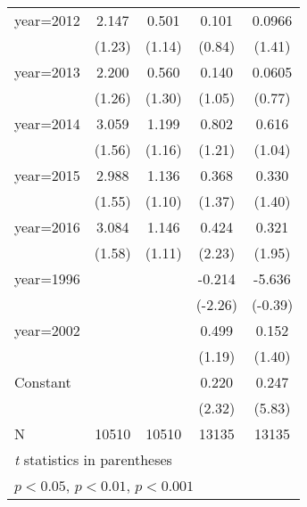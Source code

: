 \begin{table}[htbp]
\begin{tabular}{l*{4}{c}}
\addlinespace
year=2012           &       2.147         &       0.501         &       0.101         &      0.0966         \\
                    &      (1.23)         &      (1.14)         &      (0.84)         &      (1.41)         \\
\addlinespace
year=2013           &       2.200         &       0.560         &       0.140         &      0.0605         \\
                    &      (1.26)         &      (1.30)         &      (1.05)         &      (0.77)         \\
\addlinespace
year=2014           &       3.059         &       1.199         &       0.802         &       0.616         \\
                    &      (1.56)         &      (1.16)         &      (1.21)         &      (1.04)         \\
\addlinespace
year=2015           &       2.988         &       1.136         &       0.368         &       0.330         \\
                    &      (1.55)         &      (1.10)         &      (1.37)         &      (1.40)         \\
\addlinespace
year=2016           &       3.084         &       1.146         &       0.424\sym{*}  &       0.321         \\
                    &      (1.58)         &      (1.11)         &      (2.23)         &      (1.95)         \\
\addlinespace
year=1996           &                     &                     &      -0.214\sym{*}  &      -5.636         \\
                    &                     &                     &     (-2.26)         &     (-0.39)         \\
\addlinespace
year=2002           &                     &                     &       0.499         &       0.152         \\
                    &                     &                     &      (1.19)         &      (1.40)         \\
\addlinespace
Constant            &                     &                     &       0.220\sym{*}  &       0.247\sym{***}\\
                    &                     &                     &      (2.32)         &      (5.83)         \\
\midrule
N                   &       10510         &       10510         &       13135         &       13135         \\
\bottomrule
\multicolumn{5}{l}{\footnotesize \textit{t} statistics in parentheses}\\
\multicolumn{5}{l}{\footnotesize \sym{*} \(p<0.05\), \sym{**} \(p<0.01\), \sym{***} \(p<0.001\)}\\
\end{tabular}
\end{table}
